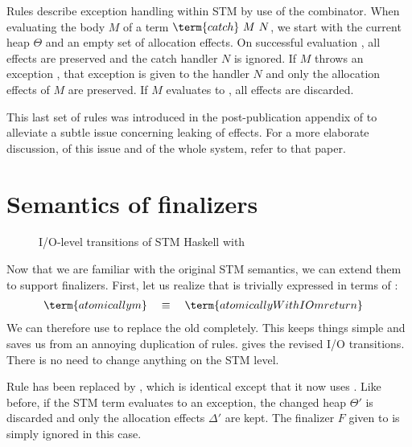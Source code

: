 Rules  describe exception handling within STM by use of the  combinator.
When evaluating the body $M$ of a term $\term{catch}\ M\ N$, we start with the current heap $\Theta$ and an empty set of allocation effects.
On successful evaluation , all effects are preserved and the catch handler $N$ is ignored.
If $M$ throws an exception , that exception is given to the handler $N$ and only the allocation effects of $M$ are preserved.
If $M$ evaluates to  , all effects are discarded.

This last set of rules was introduced in the post-publication appendix of \textcite{harris-et-al-2005} to alleviate a subtle issue concerning leaking of effects.
For a more elaborate discussion, of this issue and of the whole system, refer to that paper.


\section{Semantics of finalizers}
\label{sec:stm-fin-semantics}

\begin{figure}

\caption{I/O-level transitions of STM Haskell with }
\label{fig:step1-io}
\end{figure}

Now that we are familiar with the original STM semantics, we can extend them to support finalizers.
First, let us realize that  is trivially expressed in terms of :
\begin{align*}
\term{atomically m} & \quad\equiv\quad \term{atomicallyWithIO m return}
\end{align*}
We can therefore use  to replace the old  completely.
This keeps things simple and saves us from an annoying duplication of rules.
 gives the revised I/O transitions.
There is no need to change anything on the STM level.

Rule  has been replaced by , which is identical except that it now uses .
Like before, if the STM term evaluates to an exception, the changed heap $\Theta'$ is discarded and only the allocation effects $\Delta'$ are kept.
The finalizer $F$ given to  is simply ignored in this case.

